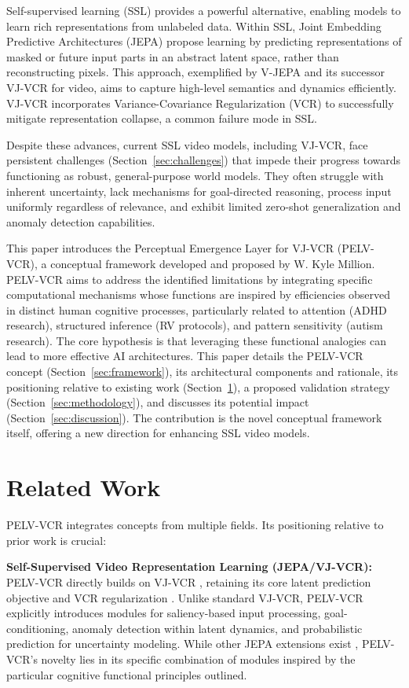 \documentclass[11pt]{article}
\begin{document}
Self-supervised learning (SSL) provides a powerful alternative, enabling models to learn rich representations from unlabeled data. Within SSL, Joint Embedding Predictive Architectures (JEPA) \cite{Assran2023} propose learning by predicting representations of masked or future input parts in an abstract latent space, rather than reconstructing pixels. This approach, exemplified by V-JEPA and its successor VJ-VCR \cite{Bardes2024, Drozdov2024} for video, aims to capture high-level semantics and dynamics efficiently. VJ-VCR incorporates Variance-Covariance Regularization (VCR) \cite{Bardes2021} to successfully mitigate representation collapse, a common failure mode in SSL.

Despite these advances, current SSL video models, including VJ-VCR, face persistent challenges (Section~\ref{sec:challenges}) that impede their progress towards functioning as robust, general-purpose world models. They often struggle with inherent uncertainty, lack mechanisms for goal-directed reasoning, process input uniformly regardless of relevance, and exhibit limited zero-shot generalization and anomaly detection capabilities.

This paper introduces the Perceptual Emergence Layer for VJ-VCR (PELV-VCR), a conceptual framework developed and proposed by W. Kyle Million. PELV-VCR aims to address the identified limitations by integrating specific computational mechanisms whose functions are inspired by efficiencies observed in distinct human cognitive processes, particularly related to attention (ADHD research), structured inference (RV protocols), and pattern sensitivity (autism research). The core hypothesis is that leveraging these functional analogies can lead to more effective AI architectures. This paper details the PELV-VCR concept (Section~\ref{sec:framework}), its architectural components and rationale, its positioning relative to existing work (Section~\ref{sec:related}), a proposed validation strategy (Section~\ref{sec:methodology}), and discusses its potential impact (Section~\ref{sec:discussion}). The contribution is the novel conceptual framework itself, offering a new direction for enhancing SSL video models.

\section{Related Work}
\label{sec:related}
PELV-VCR integrates concepts from multiple fields. Its positioning relative to prior work is crucial:

\textbf{Self-Supervised Video Representation Learning (JEPA/VJ-VCR):} PELV-VCR directly builds on VJ-VCR \cite{Bardes2024}, retaining its core latent prediction objective and VCR regularization \cite{Bardes2021}. Unlike standard VJ-VCR, PELV-VCR explicitly introduces modules for saliency-based input processing, goal-conditioning, anomaly detection within latent dynamics, and probabilistic prediction for uncertainty modeling. While other JEPA extensions exist \cite{Assran2023, Garrido2024}, PELV-VCR's novelty lies in its specific combination of modules inspired by the particular cognitive functional principles outlined.
\end{document}
